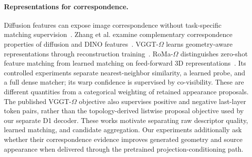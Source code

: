 \paragraph{Representations for correspondence.}
Diffusion features can expose image correspondence without task-specific
matching supervision~\cite{tang2023dift}.
Zhang et al. examine complementary correspondence properties of diffusion
and DINO features~\cite{zhang2023twofeatures}.
VGGT-$\Omega$ learns geometry-aware representations through reconstruction
training~\cite{wang2026vggtomega}. RoMa-$\Omega$ distinguishes zero-shot
feature matching from learned matching on feed-forward 3D
representations~\cite{nordstrom2026romaomega}.
Its controlled experiments separate nearest-neighbor similarity, a learned
probe, and a full dense matcher; its warp confidence is supervised by
co-visibility. These are different quantities from a categorical weighting
of retained appearance proposals. The published VGGT-$\Omega$ objective
also supervises positive and negative last-layer token pairs, rather than
the topology-derived listwise proposal objective used by our separate D1
decoder.
These works motivate separating raw descriptor quality, learned matching,
and candidate aggregation. Our experiments additionally ask whether their
correspondence evidence improves generated geometry and source appearance
when delivered through the pretrained projection-conditioning path.
